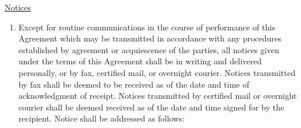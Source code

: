 \underline{Notices}
\begin{enumerate}
    \item Except for routine communications in the course of performance of
    this Agreement which may be transmitted in accordance with any
    procedures established by agreement or acquiescence of the parties, all
    notices given under the terms of this Agreement shall be in writing and
    delivered personally, or by fax, certified mail, or overnight courier.
    Notices transmitted by fax shall be deemed to be received as of the
    date and time of acknowledgment of receipt. Notices transmitted by
    certified mail or overnight courier shall be deemed received as of the
    date and time signed for by the recipient. Notice shall be addressed as
    follows:
\end{enumerate}